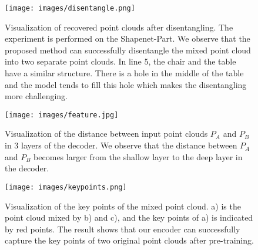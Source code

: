 \documentclass[journal]{IEEEtran}
\begin{document}
\begin{figure}[t]
\begin{center}
\texttt{[image: images/disentangle.png]}
\end{center}
\vspace{-.15in}
   \caption{Visualization of recovered point clouds after disentangling. The experiment is performed on the Shapenet-Part. 
We observe that the proposed method can successfully disentangle the mixed point cloud into two separate point clouds. In line 5, the chair and the table have a similar structure. There is a hole in the middle of the table and the model tends to fill this hole which makes the disentangling more challenging.}
\label{fig:disentangle}
\end{figure}







\begin{figure}[t]
\begin{center}
\texttt{[image: images/feature.jpg]}
\end{center}
\vspace{-.15in}
   \caption{Visualization of the distance between input point clouds $P_A$ and $P_B$ in 3 layers of the decoder. We observe that the distance between $P_A$ and $P_B$ becomes larger from the shallow layer to the deep layer in the decoder.}
\label{fig:feature}
\end{figure}




\begin{figure}[t]
\begin{center}
\texttt{[image: images/keypoints.png]}
\end{center}
\vspace{-.15in}
   \caption{Visualization of the key points of the mixed point cloud. a) is the point cloud mixed by b) and c), and the key points of a) is indicated by red points. The result shows that our encoder can successfully capture the key points of two original point clouds after pre-training.} \label{fig:keypoints}
\end{figure}
\end{document}
